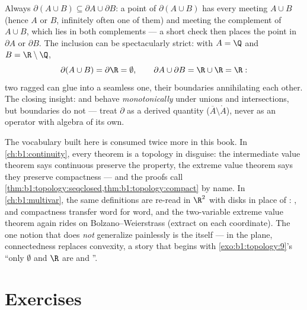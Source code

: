 \begin{example}\label{ex:b1:topology:boundaryunion}
Always $\partial(A \cup B) \subseteq \partial A \cup \partial
B$: a point of $\partial(A \cup B)$ has every 
meeting $A \cup B$ (hence $A$ or $B$, infinitely often one of
them) and meeting the complement of $A \cup B$, which lies in
both complements --- a short check then places the point in
$\partial A$ or $\partial B$. The inclusion can be spectacularly
strict: with $A = \Q$ and $B = \R\setminus\Q$,
\[
\partial(A \cup B) = \partial \R = \emptyset ,
\qquad
\partial A \cup \partial B = \R \cup \R = \R :
\]
two ragged  can glue into a seamless one, their boundaries
annihilating each other. The closing insight:  and
 behave \emph{monotonically} under unions and
intersections, but boundaries do not --- treat $\partial$ as a
derived quantity ($\overline A \setminus \mathring A$), never as
an operator with algebra of its own.
\end{example}

\begin{remark}
The vocabulary built here is consumed twice more in this book.
In \cref{ch:b1:continuity}, every theorem is a topology
 in disguise: the intermediate value theorem says
continuous  preserve the  property, the extreme
value theorem says they preserve compactness --- and the proofs
call \cref{thm:b1:topology:seqclosed,thm:b1:topology:compact}
by name. In \cref{ch:b1:multivar}, the same definitions are
re-read in $\R^2$ with disks in place of : ,
 and compactness transfer word for word, and the
two-variable extreme value theorem again rides on
Bolzano--Weierstrass (extract on each coordinate). The one
notion that does \emph{not} generalize painlessly is the
 itself --- in the plane, connectedness replaces
convexity, a story that begins with
\cref{exo:b1:topology:9}'s ``only $\emptyset$ and $\R$ are 
and ''.
\end{remark}

\section{Exercises}

